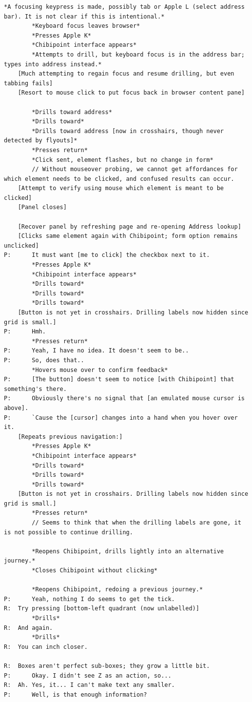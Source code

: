 \documentclass[a4paper, 12pt]{report}
\begin{document}
\begin{lstlisting}[caption={Transcript of Usability Study}, label={lst:usabilityTrans}, style=basic, language=custom, flexiblecolumns=true]
		*A focusing keypress is made, possibly tab or Apple L (select address bar). It is not clear if this is intentional.*
		*Keyboard focus leaves browser*
		*Presses Apple K*
		*Chibipoint interface appears*
		*Attempts to drill, but keyboard focus is in the address bar; types into address instead.*
	[Much attempting to regain focus and resume drilling, but even tabbing fails]
	[Resort to mouse click to put focus back in browser content pane]

		*Drills toward address*
		*Drills toward*
		*Drills toward address [now in crosshairs, though never detected by flyouts]*
		*Presses return*
		*Click sent, element flashes, but no change in form*
		// Without mouseover probing, we cannot get affordances for which element needs to be clicked, and confused results can occur.
	[Attempt to verify using mouse which element is meant to be clicked]
	[Panel closes]

	[Recover panel by refreshing page and re-opening Address lookup]
	[Clicks same element again with Chibipoint; form option remains unclicked]
P:		It must want [me to click] the checkbox next to it.
		*Presses Apple K*
		*Chibipoint interface appears*
		*Drills toward*
		*Drills toward*
		*Drills toward*
	[Button is not yet in crosshairs. Drilling labels now hidden since grid is small.]
P:		Hmh.
		*Presses return*
P:		Yeah, I have no idea. It doesn't seem to be..
P:		So, does that..
		*Hovers mouse over to confirm feedback*
P:		[The button] doesn't seem to notice [with Chibipoint] that something's there.
P:		Obviously there's no signal that [an emulated mouse cursor is above].
P:		`Cause the [cursor] changes into a hand when you hover over it.
	[Repeats previous navigation:]
		*Presses Apple K*
		*Chibipoint interface appears*
		*Drills toward*
		*Drills toward*
		*Drills toward*
	[Button is not yet in crosshairs. Drilling labels now hidden since grid is small.]
		*Presses return*
		// Seems to think that when the drilling labels are gone, it is not possible to continue drilling.

		*Reopens Chibipoint, drills lightly into an alternative journey.*
		*Closes Chibipoint without clicking*

		*Reopens Chibipoint, redoing a previous journey.*
P:		Yeah, nothing I do seems to get the tick.
R:	Try pressing [bottom-left quadrant (now unlabelled)]
		*Drills*
R:	And again.
		*Drills*
R:	You can inch closer.

R:	Boxes aren't perfect sub-boxes; they grow a little bit.
P:		Okay. I didn't see Z as an action, so...
R:	Ah. Yes, it... I can't make text any smaller.
P:		Well, is that enough information?






\end{lstlisting}
\end{document}
